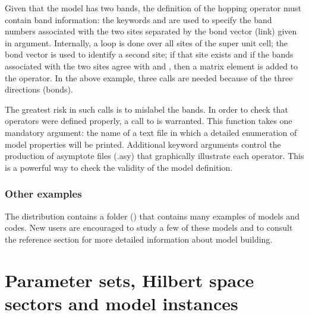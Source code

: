 \documentclass[letterpaper,10pt,english]{sphinxmanual}
\begin{document}
\sphinxAtStartPar
Given that the model has two bands, the definition of the hopping operator  must contain band information: the keywords  and  are used to specify the band numbers associated with the two sites separated by the bond vector (link) given in argument. Internally, a loop is done over all sites of the super unit cell; the bond vector is used to identify a second site; if that site exists and if the bands associated with the two sites agree with  and , then a matrix element is added to the operator. In the above example, three calls are needed because of the three directions (bonds).

\sphinxAtStartPar
The greatest risk in such calls is to mislabel the bands. In order to check that operators were defined properly, a call to  is warranted. This function takes one mandatory argument: the name of a text file in which a detailed enumeration of model properties will be printed. Additional keyword arguments control the production of asymptote files (.asy) that graphically illustrate each operator. This is a powerful way to check the validity of the model definition.


\subsection{Other examples}
\label{\detokenize{defining_models:other-examples}}
\sphinxAtStartPar
The distribution contains a folder () that contains many examples of models and codes. New users are encouraged to study a few of these models and to consult the reference section for more detailed information about model building.


\chapter{Parameter sets, Hilbert space sectors and model instances}
\label{\detokenize{parameters:parameter-sets-hilbert-space-sectors-and-model-instances}}\label{\detokenize{parameters::doc}}
\end{document}
